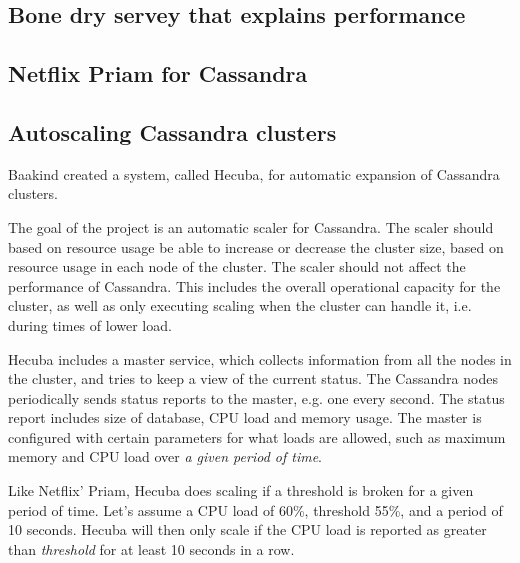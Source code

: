 \subsection{Bone dry servey that explains performance}

\subsection{Netflix Priam for Cassandra}

\subsection{Autoscaling Cassandra clusters}

Baakind\cite{baakind} created a system, called Hecuba, for automatic expansion of Cassandra clusters.

The goal of the project is an automatic scaler for Cassandra. The scaler should based on resource usage be able to increase or decrease the cluster size, based on resource usage in each node of the cluster.
The scaler should not affect the performance of Cassandra. This includes the overall operational capacity for the cluster, as well as only executing scaling when the cluster can handle it, i.e. during times of lower load.

Hecuba includes a master service, which collects information from all the nodes in the cluster, and tries to keep a view of the current status. The Cassandra nodes periodically sends status reports to the master, e.g. one every second. The status report includes size of database, CPU load and memory usage. The master is configured with certain parameters for what loads are allowed, such as maximum memory and CPU load over \emph{a given period of time}.

Like Netflix' Priam, Hecuba does scaling if a threshold is broken for a given period of time. Let's assume a CPU load of 60\%, threshold 55\%, and a period of 10 seconds. Hecuba will then only scale if the CPU load is reported as greater than \emph{threshold} for at least 10 seconds in a row.


